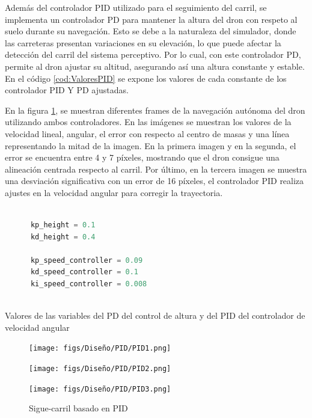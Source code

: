 Además del controlador PID utilizado para el seguimiento del carril, se implementa un controlador PD para mantener la altura del dron con respeto al suelo durante su navegación. 
Esto se debe a la naturaleza del simulador, donde las carreteras presentan variaciones en su elevación, lo que puede afectar la detección del carril del sistema perceptivo. Por lo cual, 
con este controlador PD, permite al dron ajustar su altitud, asegurando así una altura constante y estable. En el código \ref{cod:ValoresPID} se expone los valores de cada 
constante de los controlador PID Y PD ajustadas. \newline

En la figura \ref{sigue-carril}, se muestran diferentes frames de la navegación autónoma 
del dron utilizando ambos controladores. En las imágenes
se muestran los valores de la velocidad lineal, angular, el error con respecto al centro de masas y una línea representando la mitad de la imagen. 
En la primera imagen y en la segunda, el error se encuentra
entre 4 y 7 píxeles, mostrando que el dron consigue una alineación centrada respecto al carril. Por último, en la tercera imagen 
se muestra una desviación significativa con un error de 16 píxeles, el controlador
PID realiza ajustes en la velocidad angular para corregir la trayectoria. 
  \begin{code}[h]
    \begin{lstlisting}[language=Python]

      kp_height = 0.1
      kd_height = 0.4

      kp_speed_controller = 0.09
      kd_speed_controller = 0.1
      ki_speed_controller = 0.008
     
    \end{lstlisting}
    \caption[Valores de las variables del PD del control de altura y del PID del controlador de velocidad angular]{Valores de las variables del PD del control de altura y del PID del controlador de velocidad angular}
    \label{cod:ValoresPID}
    \end{code} 

    \begin{figure}[H]
      \centering
    
      \begin{minipage}[t]{0.3\textwidth}
          \centering
          \texttt{[image: figs/Diseño/PID/PID1.png]}
          \caption*{}
      \end{minipage}
      \hfill
      \begin{minipage}[t]{0.3\textwidth}
          \centering
          \texttt{[image: figs/Diseño/PID/PID2.png]}
          \caption*{}
      \end{minipage}
      \hfill
      \begin{minipage}[t]{0.3\textwidth}
          \centering
          \texttt{[image: figs/Diseño/PID/PID3.png]}
          \caption*{}
      \end{minipage}
      
      \caption{Sigue-carril basado en PID}
      \label{sigue-carril}
    \end{figure}

